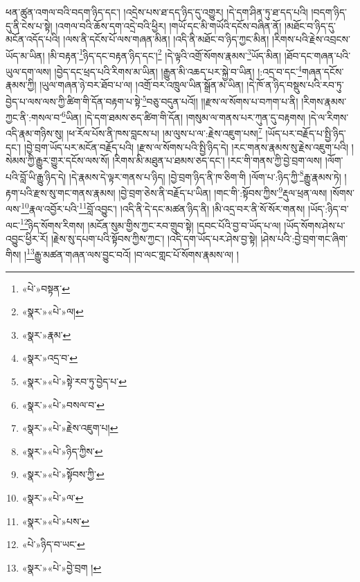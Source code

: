 ཕན་ཚུན་འགལ་བའི་བདག་ཉིད་དང་། །འདྲེས་པས་ཐ་དད་ཉིད་དུ་འགྱུར། །དེ་དག་ཤིན་ཏུ་ཐ་དད་པའི། །བདག་ཉིད་དུ་ནི་ངེས་པ་སྟེ། །འགལ་བའི་ཆོས་དག་འདྲེ་བའི་ཕྱིར། །གཡོ་དང་མི་གཡོའི་དངོས་བཞིན་ནོ། །མཐོང་བ་ཉིད་དུ་མངོན་འདོད་པའི། །ལས་ནི་དངོས་པོ་ལས་གཞན་མིན། །འདི་ནི་མཐོང་བ་ཉིད་ཀྱང་མིན། །རིགས་པའི་རྗེས་འབྲངས་ཡོད་མ་ཡིན། །མི་བརྟན་\footnote{«པེ་»བསྟན་}ཉིད་དང་བརྟན་ཉིད་དང་།\footnote{«སྣར་»«པེ་»ལ།} །དེ་ལྟའི་འགྲོ་སོགས་རྣམས་\footnote{«སྣར་»རྣམ་}ཡོད་མིན། །ཐོབ་དང་གཞན་པའི་ཡུལ་དག་ལས། །བྱེད་དང་ཕྲད་པའི་རིགས་མ་ཡིན། །རྒྱུན་མི་འཆད་པར་སྐྱེ་བ་ཡིན། །:འདྲ་བ་དང་\footnote{«སྣར་»འདྲ་བ་}གཞན་དངོས་རྣམས་ཀྱི། །ཡུལ་གཞན་ཉེ་བར་ཐོབ་པ་ལ། །འགྲོ་བར་འཁྲུལ་ཡིན་སྒྲོན་མ་ཡིན། །དེ་ཁོ་ན་ཉིད་བསྡུས་པའི་རབ་ཏུ་བྱེད་པ་ལས་ལས་ཀྱི་ཚིག་གི་དོན་བརྟག་པ་སྟེ་\footnote{«སྣར་»«པེ་»སྟེ་རབ་ཏུ་བྱེད་པ་}བཅུ་བདུན་པའོ།། །།རྫས་ལ་སོགས་པ་བཀག་པ་ནི། །རིགས་རྣམས་ཀྱང་ནི་:གསལ་བ་\footnote{«སྣར་»«པེ་»བསལ་བ་}ཡིན། །དེ་དག་ཐམས་ཅད་ཚིག་གི་དོན། །གསུམ་ལ་གནས་པར་ཀུན་དུ་བརྟགས། །དེ་ལ་རིགས་འདི་རྣམ་གཉིས་སུ། །ཕ་རོལ་པོས་ནི་ཁས་བླངས་པ། །མ་ལུས་པ་ལ་:རྗེས་འཇུག་པས།\footnote{«སྣར་»«པེ་»རྗེས་འཇུག་པ།} །ཡོད་པར་བརྗོད་པ་སྤྱི་ཉིད་དང་། །བྱེ་བྲག་ཡོད་པར་མངོན་བརྗོད་པའི། །རྫས་ལ་སོགས་པའི་སྤྱི་ཉིད་དེ། །རང་གནས་རྣམས་སུ་རྗེས་འཇུག་པའི། །སེམས་ཀྱི་རྒྱུར་གྱུར་དངོས་ལས་སོ། །རིགས་མི་མཐུན་པ་ཐམས་ཅད་དང་། །རང་གི་གནས་ཀྱི་བྱེ་བྲག་ལས། །ལོག་པའི་བློ་ཡི་རྒྱུ་ཉིད་དེ། །དེ་རྣམས་དེ་ལྟར་གནས་པ་ཉིད། །བྱེ་བྲག་ཉིད་ནི་ཁ་ཅིག་གི །ལོག་པ་:ཉིད་ཀྱི་\footnote{«སྣར་»«པེ་»ཉིད་ཀྱིས་}རྒྱུ་རྣམས་ཏེ། །རྟག་པའི་རྫས་སུ་གང་གནས་རྣམས། །བྱེ་བྲག་ཅེས་ནི་བརྗོད་པ་ཡིན། །གང་གི་:སྟོབས་ཀྱིས་\footnote{«སྣར་»«པེ་»སྟོབས་ཀྱི་}རྡུལ་ཕྲན་ལས། །སོགས་ལས་\footnote{«སྣར་»«པེ་»ལ་}རྣལ་འབྱོར་པའི་\footnote{«སྣར་»«པེ་»པས་}བློ་འབྱུང་། །འདི་ནི་དེ་དང་མཚན་ཉིད་ནི། །མི་འདྲ་བར་ནི་སོ་སོར་གནས། །ཡོད་:ཉིད་བ་ལང་\footnote{«པེ་»ཉིད་བ་ཡང་}ཉིད་སོགས་རིགས། །མངོན་སུམ་གྱིས་ཀྱང་རབ་གྲུབ་སྟེ། །དབང་པོའི་བྱ་བ་ཡོད་པ་ལ། །ཡོད་སོགས་ཤེས་པ་འབྱུང་ཕྱིར་རོ། །རྗེས་སུ་དཔག་པའི་སྟོབས་ཀྱིས་ཀྱང་། །འདི་དག་ཡོད་པར་ཤེས་བྱ་སྟེ། །ཤེས་པའི་:བྱེ་བྲག་གང་ཞིག་གིས། །\footnote{«སྣར་»«པེ་»བྱེ་བྲག །}རྒྱུ་མཚན་གཞན་ལས་བྱུང་བའོ། །བ་ལང་གླང་པོ་སོགས་རྣམས་ལ། །
